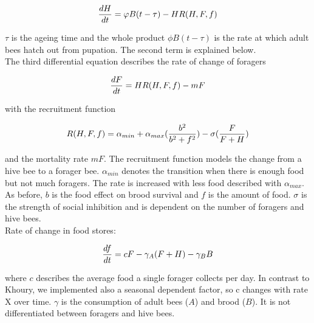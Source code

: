 	\begin{equation}\label{eq:changeHiveBees}
		{dH \over dt}=\phi B(t-\tau)-HR(H,F,f)
	\end{equation}
	
	$\tau$ is the ageing time and the whole product $\phi B(t-\tau)$ is the rate at which adult bees hatch out from pupation. The second term is explained below.\\ 
	The third differential equation describes the rate of change of foragers
	
	\begin{equation}\label{eq:changeForagers}
		{dF \over dt} = HR(H,F,f)-m F
	\end{equation}
	
	with the recruitment function
	
	\begin{equation}\label{eq:recruitmentFunction}
		R(H,F,f) = \alpha_{min} + \alpha_{max}({b^2 \over b^2+f^2})-\sigma({F \over F+H})
	\end{equation}
	
	and the mortality rate $mF$. The recruitment function models the change from a hive bee to a forager bee. $\alpha_{min}$ denotes the transition when there is enough food but not much foragers. The rate is increased with less food described with $\alpha_{max}$. As before, $b$ is the food effect on brood survival and $f$ is the amount of food. $\sigma$ is the strength of social inhibition and is dependent on the number of foragers and hive bees.\\
	Rate of change in food stores:
	
	\begin{equation}\label{eq:changeFoodStoreConst}
		{df \over dt} = c F - \gamma_A (F+H) - \gamma_B B
	\end{equation}
	
	
	
	where $c$ describes the average food a single forager collects per day. In contrast to Khoury, we implemented also a seasonal dependent factor, so c changes with rate X over time. $\gamma$ is the consumption of adult bees ($A$) and brood ($B$). It is not differentiated between foragers and hive bees.  

